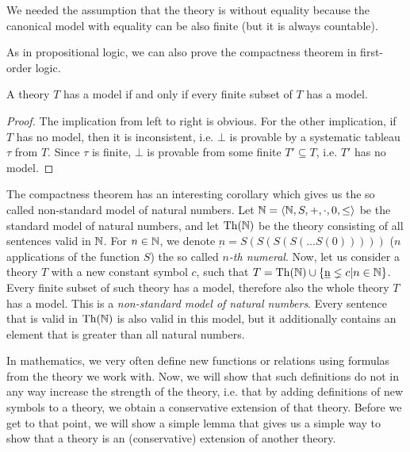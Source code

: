 We needed the assumption that the theory is without equality because the canonical model with equality can be also finite (but it is always countable).

As in propositional logic, we can also prove the compactness theorem in first-order logic.

\begin{theorem}[compactness]
A theory $T$ has a model if and only if every finite subset of $T$ has a model.
\end{theorem}
\begin{proof}
The implication from left to right is obvious. For the other implication, if $T$ has no model, then it is inconsistent, i.e. $\bot$ is provable by a systematic tableau $\tau$ from $T$. Since $\tau$ is finite, $\bot$ is provable from some finite $T' \subseteq T$, i.e. $T'$ has no model.
\end{proof}

The compactness theorem has an interesting corollary which gives us the so called non-standard model of natural numbers. Let $\mathbb{N} = \langle \mathbb{N}, S, +, \cdot, 0, \leq \rangle$ be the standard model of natural numbers, and let $\operatorname{Th}(\mathbb{N})$ be the theory consisting of all sentences valid in $\mathbb{N}$. For $n \in \mathbb{N}$, we denote $\underbar{n} = S(S(S(S(... S(0)))))$ ($n$ applications of the function $S$) the so called \emph{$n$-th numeral}. Now, let us consider a theory $T$ with a new constant symbol $c$, such that $T = \operatorname{Th}(\mathbb{N}) \cup \{\underbar{n} \lneq c | n \in \mathbb{N}\}$. Every finite subset of such theory has a model, therefore also the whole theory $T$ has a model. This is a \emph{non-standard model of natural numbers}. Every sentence that is valid in $\operatorname{Th}(\mathbb{N})$ is also valid in this model, but it additionally contains an element that is greater than all natural numbers.

In mathematics, we very often define new functions or relations using formulas from the theory we work with. Now, we will show that such definitions do not in any way increase the strength of the theory, i.e. that by adding definitions of new symbols to a theory, we obtain a conservative extension of that theory. Before we get to that point, we will show a simple lemma that gives us a simple way to show that a theory is an (conservative) extension of another theory.

